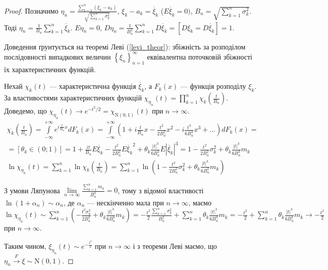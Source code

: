 \begin{proof}
    Позначимо $\eta_n = \frac{\sum\limits_{k=1}^n (\xi_k - a_k)}
    {\sqrt{\sum\limits_{k=1}^n \sigma_k^2}}$, $\xi_k - a_k = \mathring{\xi_k}$ ($E\mathring{\xi_k} = 0)$, 
    $B_n = \sqrt{\sum\limits_{k=1}^n \sigma_k^2}$. 
    Тоді $\eta_n = \frac{1}{B_n}\sum\limits_{k=1}^n \mathring{\xi_k}$.
    $E\eta_n = 0$, $D\eta_n = \frac{1}{B_n^2}\sum\limits_{k=1}^n D\mathring{\xi_k} = 
    \left[D\xi_k = D\mathring{\xi_k}\right] = 1$.

    Доведення ґрунтується на теоремі Леві (\ref{levi_theor}): збіжність за розподілом послідовності 
    випадкових величин $\left\{ \xi_n\right\}_{n=1}^{\infty}$ еквівалентна поточковій збіжності їх
    характеристичних функцій.

    Нехай $\chi_k(t)$ --- характеристична функція $\mathring{\xi_k}$, а $F_k(x)$ --- 
    функція розподілу $\xi_k$.
    За властивостями характеристичних функцій $\chi_{\eta_n}(t) = 
    \prod\limits_{k=1}^n \chi_k(\frac{t}{B_n})$. 
    Доведемо, що $\chi_{\eta_n}(t)\to e^{-t^2/2} = 
    \chi_{\mathrm{N}(0, 1)}(t)$ при $ n \to \infty$.
    \begin{gather*}\chi_k\left(\frac{t}{B_n}\right) = \int\limits_{-\infty}^{+\infty} e^{i\frac{t}{B_n}x} dF_k(x) = 
    \int\limits_{-\infty}^{+\infty} \left(1 + i\frac{t}{B_n}x - \frac{t^2}{2B_n^2}x^2 - 
    i\frac{t^3}{6B_n^3}x^3 + ...\right) dF_k(x) = \\ = \left[\theta_k \in (0; 1)\right]
    = 1 + \frac{it}{B_n}E\mathring{\xi_k} - \frac{t^2}{2B_n^2}
    E\mathring{\xi_k}^2 + \theta_k\frac{|t|^3}{6B_n^3}E|\mathring{\xi_k}|^3 = 
    1 - \frac{t^2}{2B_n^2}\sigma_k^2 + \theta_k\frac{|t|^3}{6B_n^3}m_k \\
    \ln\chi_{\eta_n}(t) = \sum\limits_{k=1}^n \ln \chi_k \left(\frac{t}{B_n}\right) = 
    \sum\limits_{k=1}^n \ln\left(1 - \frac{t^2}{2B_n^2}\sigma_k^2 + 
    \theta_k\frac{|t|^3}{6B_n^3}m_k\right)
    \end{gather*}

    З умови Ляпунова $\underset{n \rightarrow \infty}{\lim} \frac{\sum\limits_{k=1}^n m_k}{B_n^3} = 0$, 
    тому з відомої властивості $\ln(1 + \alpha_n) \sim \alpha_n$, де $\alpha_n$ --- нескінченно мала при 
    $n \rightarrow \infty$, маємо $\ln\chi_{\eta_n}(t) \sim \sum\limits_{k=1}^n\left(
        -\frac{t^2\sigma^2_k}{2B_n^2} + \theta_k\frac{|t|^3}{6B_n^3}m_k
    \right) 
    = -\frac{t^2}{2}\frac{\sum\limits_{k=1}^n\sigma_k^2}{B_n^2} + \sum\limits_{k=1}^n \theta_k\frac{|t|^3}{6B_n^3}m_k= -\frac{t^2}{2} 
    + \sum\limits_{k=1}^n \theta_k\frac{|t|^3}{6B_n^3}m_k \to -\frac{t^2}{2} 
    $ при $n \rightarrow \infty$.
    
    Таким чином, $\xi_{\eta_n}(t) \sim e^{-\frac{t^2}{2}}$ при $n \rightarrow \infty$ і 
    з теореми Леві маємо, що $\eta_n \overset{F}{\longrightarrow} \xi \sim \mathrm{N}(0, 1)$.
\end{proof}
